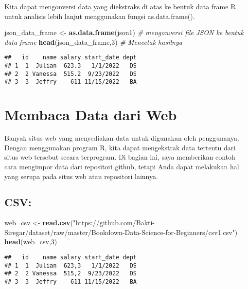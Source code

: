 \documentclass[
]{book}
\newenvironment{Shaded}{\begin{snugshade}}{\end{snugshade}}
\newcommand{\CommentTok}[1]{\textcolor[rgb]{0.56,0.35,0.01}{\textit{#1}}}
\newcommand{\DecValTok}[1]{\textcolor[rgb]{0.00,0.00,0.81}{#1}}
\newcommand{\KeywordTok}[1]{\textcolor[rgb]{0.13,0.29,0.53}{\textbf{#1}}}
\newcommand{\NormalTok}[1]{#1}
\newcommand{\StringTok}[1]{\textcolor[rgb]{0.31,0.60,0.02}{#1}}
\begin{document}
Kita dapat mengonversi data yang diekstraks di atas ke bentuk data frame R untuk analisis lebih lanjut menggunakan fungsi as.data.frame().

\begin{Shaded}
\begin{Highlighting}[]
\NormalTok{json_data_frame <-}\StringTok{ }\KeywordTok{as.data.frame}\NormalTok{(json1)            }\CommentTok{# mengonversi file JSON ke bentuk data frame}
\KeywordTok{head}\NormalTok{(json_data_frame,}\DecValTok{3}\NormalTok{)                            }\CommentTok{# Mencetak hasilnya}
\end{Highlighting}
\end{Shaded}

\begin{verbatim}
##   id    name salary start_date dept
## 1  1  Julian  623.3   1/1/2022   DS
## 2  2 Vanessa  515.2  9/23/2022   DS
## 3  3  Jeffry    611 11/15/2022   BA
\end{verbatim}

\hypertarget{membaca-data-dari-web}{%
\section{Membaca Data dari Web}\label{membaca-data-dari-web}}

Banyak situs web yang menyediakan data untuk digunakan oleh penggunanya. Dengan menggunakan program R, kita dapat mengekstrak data tertentu dari situs web tersebut secara terprogram. Di bagian ini, saya memberikan contoh cara mengimpor data dari repositori github, tetapi Anda dapat melakukan hal yang serupa pada situs web atau repositori lainnya.

\hypertarget{csv}{%
\subsection{CSV:}\label{csv}}

\begin{Shaded}
\begin{Highlighting}[]
\NormalTok{web_csv <-}\StringTok{ }\KeywordTok{read.csv}\NormalTok{(}\StringTok{"https://github.com/Bakti-Siregar/dataset/raw/master/Bookdown-Data-Science-for-Beginners/csv1.csv"}\NormalTok{)}
\KeywordTok{head}\NormalTok{(web_csv,}\DecValTok{3}\NormalTok{)}
\end{Highlighting}
\end{Shaded}

\begin{verbatim}
##   id    name salary start_date dept
## 1  1  Julian  623,3   1/1/2022   DS
## 2  2 Vanessa  515,2  9/23/2022   DS
## 3  3  Jeffry    611 11/15/2022   BA
\end{verbatim}
\end{document}
